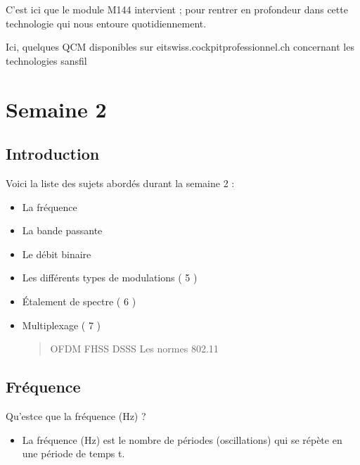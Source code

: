 \documentclass[letterpaper,10pt,french]{sphinxmanual}
\begin{document}
\sphinxAtStartPar
C’est ici que le module M144 intervient ; pour rentrer en profondeur dans cette technologie qui nous entoure quotidiennement.

\sphinxAtStartPar
Ici, quelques QCM disponibles sur eitswiss.cockpitprofessionnel.ch concernant les technologies sans\sphinxhyphen{}fil



\section{Semaine 2}
\label{\detokenize{Documentation-M144:semaine-2}}

\subsection{Introduction}
\label{\detokenize{Documentation-M144:id1}}
\sphinxAtStartPar
Voici la liste des sujets abordés durant la semaine 2 :
\begin{itemize}
\item {} 
\sphinxAtStartPar
La fréquence

\item {} 
\sphinxAtStartPar
La bande passante

\item {} 
\sphinxAtStartPar
Le débit binaire

\item {} 
\sphinxAtStartPar
Les différents types de modulations ( 5 )

\item {} 
\sphinxAtStartPar
Étalement de spectre ( 6 )

\item {} 
\sphinxAtStartPar
Multiplexage ( 7 )
\begin{quote}

\sphinxAtStartPar
OFDM
FHSS
DSSS
Les normes 802.11
\end{quote}

\end{itemize}


\subsection{Fréquence}
\label{\detokenize{Documentation-M144:frequence}}
\sphinxAtStartPar
Qu’est\sphinxhyphen{}ce que la fréquence (Hz) ?
\begin{itemize}
\item {} 
\sphinxAtStartPar
La fréquence (Hz) est le nombre de périodes (oscillations) qui se répète en une période de temps t.

\end{itemize}
\end{document}
